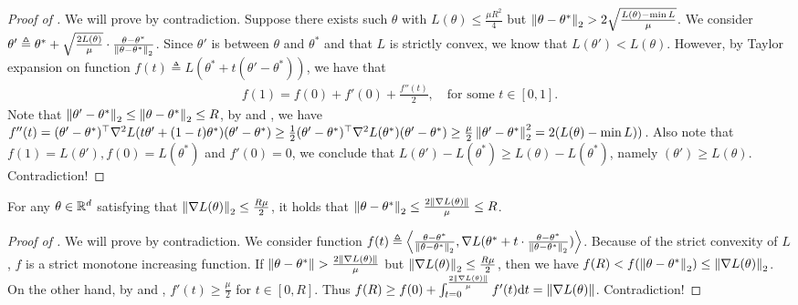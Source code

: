 \begin{proof}[Proof of ]
	We will prove by contradiction. Suppose there exists such $\theta$ with $L(\theta)\le \frac{\mu R^2}{4}$ but $\left\|\theta-\theta^*\right\|_2> 2\sqrt{\frac{L(\theta)-\min L}{\mu}}$. We consider $\theta'\triangleq \theta^* + \sqrt{\frac{2L(\theta)}{\mu}}\cdot \frac{\theta-\theta^*}{\left\|\theta-\theta^*\right\|_2}$. Since $\theta'$ is between $\theta$ and $\theta^*$ and that $L$ is strictly convex, we know that $L(\theta')<L(\theta)$. However, by Taylor expansion on function $f(t)\triangleq L(\theta^* + t(\theta'-\theta^*))$, we have that 
	\begin{align}
	f(1) = f(0)+f'(0)+ \frac{f''(t) 	}{2}, \quad \text{for some $t\in[0,1]$.}
	\end{align}
Note that $\left\|\theta' - \theta^*\right\|_2\le \left\|\theta - \theta^*\right\|_2 \le R$, by   and ,
 we have $f''(t)  = (\theta'-\theta^*)^\top \nabla^2 L(t\theta' +(1-t) \theta^*)(\theta'-\theta^*) \ge \frac{1}{2}(\theta'-\theta^*)^\top \nabla^2 L(\theta^*)(\theta'-\theta^*) \ge \frac{\mu}{2} \left\|\theta'-\theta^*\right\|_2^2 =  2(L(\theta)-\min L))$.
  Also note that $f(1) = L(\theta'), f(0)=L(\theta^*)$ and $ f'(0)=0$, we conclude that $L(\theta')-L(\theta^*) \ge L(\theta) - L(\theta^*)$, namely $(\theta')\ge L(\theta)$. Contradiction! 
\end{proof}

\begin{lemma}\label{lem:small_gradient_imply_small_loss}
	For any $\theta\in\mathbb{R}^d$ satisfying that $\left\|\nabla L(\theta)\right\|_2\le \frac{R\mu}{2}$, it holds that $\left\|\theta-\theta^*\right\|_2\le \frac{2\left\|\nabla L(\theta)\right\|}{\mu}\le R$.
\end{lemma}

\begin{proof}[Proof of ]
	We will prove by contradiction. We consider function $f(t)\triangleq \left\langle \frac{\theta-\theta^*}{\left\|\theta-\theta^*\right\|_2},\nabla L(\theta^*+ t\cdot \frac{\theta-\theta^*}{\left\|\theta-\theta^*\right\|_2}) \right\rangle$. Because of the strict convexity of $L$, $f$ is a strict monotone increasing function. If $\norm{\theta-\theta^*}> \frac{2\norm{\nabla L(\theta)}}{\mu}$ but $\left\|\nabla L(\theta)\right\|_2\le \frac{R\mu}{2}$, then we have $f(R)<f(\left\|\theta-\theta^*\right\|_2)\le \left\|\nabla L(\theta)\right\|_2 $. On the other hand, by  and , $f'(t)\ge \frac{\mu}{2}$ for $t\in[0,R]$. Thus $f(R)\ge f(0) + \int_{t=0}^{ \frac{2\left\|\nabla L(\theta)\right\|}{\mu}} f'(t)\mathrm{d} t =  \left\|\nabla L(\theta)\right\| $. Contradiction! 
\end{proof}


